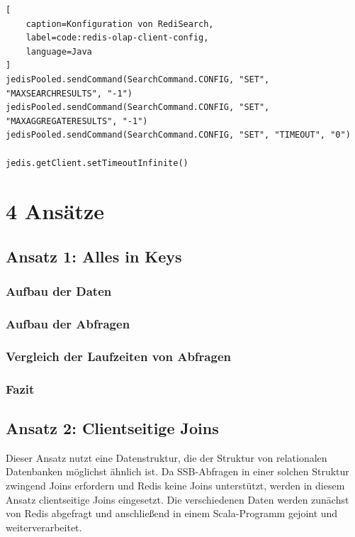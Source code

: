 \begin{lstlisting}[
    caption=Konfiguration von RediSearch,
    label=code:redis-olap-client-config,
    language=Java
]
jedisPooled.sendCommand(SearchCommand.CONFIG, "SET", "MAXSEARCHRESULTS", "-1")
jedisPooled.sendCommand(SearchCommand.CONFIG, "SET", "MAXAGGREGATERESULTS", "-1")
jedisPooled.sendCommand(SearchCommand.CONFIG, "SET", "TIMEOUT", "0")

jedis.getClient.setTimeoutInfinite()
\end{lstlisting}

\section{4 Ansätze}
\subsection{Ansatz 1: Alles in Keys}
\subsubsection{Aufbau der Daten}
\subsubsection{Aufbau der Abfragen}
\subsubsection{Vergleich der Laufzeiten von Abfragen}
\subsubsection{Fazit}




\subsection{Ansatz 2: Clientseitige Joins}
Dieser Ansatz nutzt eine Datenstruktur, die der Struktur von relationalen Datenbanken möglichst ähnlich ist. Da SSB-Abfragen in einer solchen Struktur zwingend Joins erfordern und Redis keine Joins unterstützt, werden in diesem Ansatz clientseitige Joins eingesetzt. Die verschiedenen Daten werden zunächst von Redis abgefragt und anschließend in einem Scala-Programm gejoint und weiterverarbeitet.

